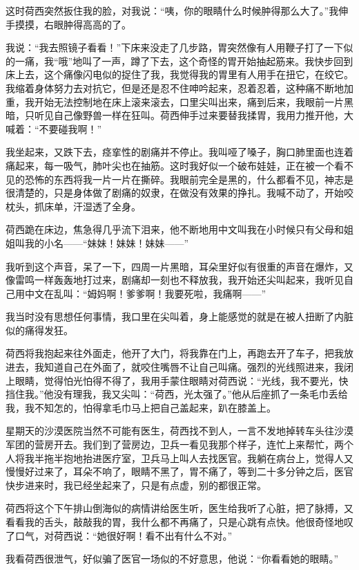 \par 这时荷西突然扳住我的脸，对我说：“咦，你的眼睛什么时候肿得那么大了。”我伸手摸摸，右眼肿得高高的了。
\par 我说：“我去照镜子看看！”下床来没走了几步路，胃突然像有人用鞭子打了一下似的一痛，我“哦”地叫了一声，蹲了下去，这个奇怪的胃开始抽起筋来。我快步回到床上去，这个痛像闪电似的捉住了我，我觉得我的胃里有人用手在扭它，在绞它。我缩着身体努力去对抗它，但是还是忍不住呻吟起来，忍着忍着，这种痛不断地加重，我开始无法控制地在床上滚来滚去，口里尖叫出来，痛到后来，我眼前一片黑暗，只听见自己像野兽一样在狂叫。荷西伸手过来要替我揉胃，我用力推开他，大喊着：“不要碰我啊！”
\par 我坐起来，又跌下去，痉挛性的剧痛并不停止。我叫哑了嗓子，胸口肺里面也连着痛起来，每一吸气，肺叶尖也在抽筋。这时我好似一个破布娃娃，正在被一个看不见的恐怖的东西将我一片一片在撕碎。我眼前完全是黑的，什么都看不见，神志是很清楚的，只是身体做了剧痛的奴隶，在做没有效果的挣扎。我喊不动了，开始咬枕头，抓床单，汗湿透了全身。
\par 荷西跪在床边，焦急得几乎流下泪来，他不断地用中文叫我在小时候只有父母和姐姐叫我的小名——“妹妹！妹妹！妹妹——”
\par 我听到这个声音，呆了一下，四周一片黑暗，耳朵里好似有很重的声音在爆炸，又像雷鸣一样轰轰地打过来，剧痛却一刻也不释放我，我开始还尖叫起来，我听见自己用中文在乱叫：“姆妈啊！爹爹啊！我要死啦，我痛啊——”
\par 我当时没有思想任何事情，我口里在尖叫着，身上能感觉的就是在被人扭断了内脏似的痛得发狂。
\par 荷西将我抱起来往外面走，他开了大门，将我靠在门上，再跑去开了车子，把我放进去，我知道自己在外面了，就咬住嘴唇不让自己叫痛。强烈的光线照进来，我闭上眼睛，觉得怕光怕得不得了，我用手蒙住眼睛对荷西说：“光线，我不要光，快挡住我。”他没有理我，我又尖叫：“荷西，光太强了。”他从后座抓了一条毛巾丢给我，我不知怎的，怕得拿毛巾马上把自己盖起来，趴在膝盖上。
\par 星期天的沙漠医院当然不可能有医生，荷西找不到人，一言不发地掉转车头往沙漠军团的营房开去。我们到了营房边，卫兵一看见我那个样子，连忙上来帮忙，两个人将我半拖半抱地抬进医疗室，卫兵马上叫人去找医官。我躺在病台上，觉得人又慢慢好过来了，耳朵不响了，眼睛不黑了，胃不痛了，等到二十多分钟之后，医官快步进来时，我已经坐起来了，只是有点虚，别的都很正常。
\par 荷西将这个下午排山倒海似的病情讲给医生听，医生给我听了心脏，把了脉搏，又看看我的舌头，敲敲我的胃，我什么都不再痛了，只是心跳有点快。他很奇怪地叹了口气，对荷西说：“她很好啊！看不出有什么不对。”
\par 我看荷西很泄气，好似骗了医官一场似的不好意思，他说：“你看看她的眼睛。”
